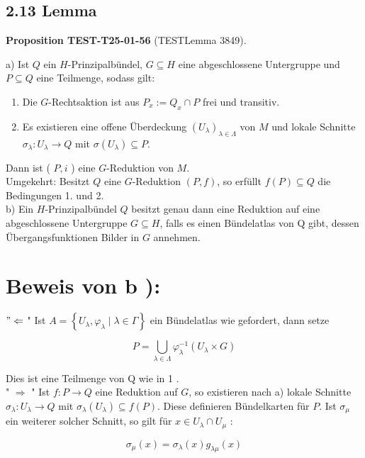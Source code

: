 \documentclass[10pt, letterpaper]{article}
\newcommand{\CustomHeading}[3]{%
  \par\medskip\noindent%
  \textbf{#1 #2} \textnormal{(#3)}.\enskip%
}
\newenvironment{PROP}[2]{\begin{unitbox}\CustomHeading{Proposition}{#1}{#2}}{\end{unitbox}}
\begin{document}
\subsection*{2.13 Lemma}
\begin{PROP}{TEST-T25-01-56}{TESTLemma 3849}
a) Ist $Q$ ein $H$-Prinzipalbündel, $G \subseteq H$ eine abgeschlossene Untergruppe und $P \subseteq Q$ eine Teilmenge, sodass gilt:

\begin{enumerate}
  \item Die $G$-Rechtsaktion ist aus $P_{x}:=Q_{x} \cap P$ frei und transitiv.
  \item Es existieren eine offene Überdeckung $\left(U_{\lambda}\right)_{\lambda \in \Lambda}$ von $M$ und lokale Schnitte $\sigma_{\lambda}: U_{\lambda} \rightarrow Q$ mit $\sigma\left(U_{\lambda}\right) \subseteq P$.
\end{enumerate}

Dann ist ( $P, i$ ) eine $G$-Reduktion von $M$.\\
Umgekehrt: Besitzt $Q$ eine $G$-Reduktion $(P, f)$, so erfüllt $f(P) \subseteq Q$ die Bedingungen 1. und 2.\\
b) Ein $H$-Prinzipalbündel $Q$ besitzt genau dann eine Reduktion auf eine abgeschlossene Untergruppe $G \subseteq H$, falls es einen Bündelatlas von Q gibt, dessen Übergangsfunktionen Bilder in $G$ annehmen.
\end{PROP}

\section*{Beweis von $\mathbf{b}$ ):}
$" \Leftarrow$ " Ist $A=\left\{U_{\lambda}, \varphi_{\lambda} \mid \lambda \in \Gamma\right\}$ ein Bündelatlas wie gefordert, dann setze

$$
P=\bigcup_{\lambda \in \Lambda} \varphi_{\lambda}^{-1}\left(U_{\lambda} \times G\right)
$$

Dies ist eine Teilmenge von Q wie in 1 .\\
" $\Rightarrow$ " Ist $f: P \rightarrow Q$ eine Reduktion auf $G$, so existieren nach a) lokale Schnitte $\sigma_{\lambda}: U_{\lambda} \rightarrow Q$ mit $\sigma_{\lambda}\left(U_{\lambda}\right) \subseteq f(P)$. Diese definieren Bündelkarten für $P$. Ist $\sigma_{\mu}$ ein weiterer solcher Schnitt, so gilt für $x \in U_{\lambda} \cap U_{\mu}$ :

$$
\sigma_{\mu}(x)=\sigma_{\lambda}(x) g_{\lambda \mu}(x)
$$
\end{document}
